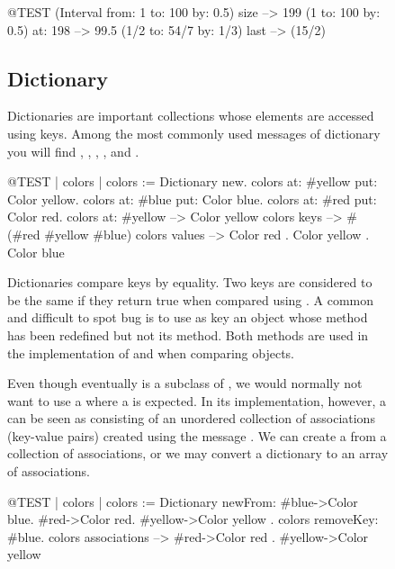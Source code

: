 \documentclass[a4paper,10pt,twoside]{book}
\begin{document}
\begin{figure}
\begin{center}
\begin{code}{@TEST}
(Interval from: 1 to: 100 by: 0.5) size --> 199
(1 to: 100 by: 0.5) at: 198 --> 99.5
(1/2 to: 54/7 by: 1/3) last --> (15/2)
\end{code}

\subsection{Dictionary}
Dictionaries are important collections whose elements are accessed using keys. 
Among the most commonly used messages of dictionary you will find , , , , and .

\begin{code}{@TEST | colors |}
colors := Dictionary new.
colors at: #yellow put: Color yellow.
colors at: #blue put: Color blue.
colors at: #red put: Color red.
colors at: #yellow --> Color yellow
colors keys          --> #(#red #yellow #blue)
colors values       -->  {Color red . Color yellow . Color blue}
\end{code}

Dictionaries compare keys by equality.
Two keys are considered to be the same if they return true when compared using \ct{=}.
A common and difficult to spot bug is to use as key an object whose \ct{=} method has been redefined but not its  method.
Both methods are used in the implementation of  and when comparing objects.

Even though  eventually is a subclass of , we would normally not want to use a  where a  is expected.
In its implementation, however, a  can be seen as consisting of an unordered collection of associations (key-value pairs) created using the message .
We can create a  from a collection of associations, or we may convert a dictionary to an array of associations.

\begin{code}{@TEST | colors |}
colors := Dictionary newFrom: { #blue->Color blue. #red->Color red. #yellow->Color yellow }.
colors removeKey: #blue.
colors associations --> {#red->Color red . #yellow->Color yellow}
\end{code}


\end{center}
\end{figure}
\end{document}
